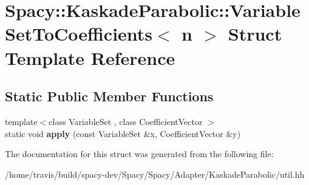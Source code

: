 \hypertarget{structSpacy_1_1KaskadeParabolic_1_1VariableSetToCoefficients}{\section{Spacy\-:\-:Kaskade\-Parabolic\-:\-:Variable\-Set\-To\-Coefficients$<$ n $>$ Struct Template Reference}
\label{structSpacy_1_1KaskadeParabolic_1_1VariableSetToCoefficients}
}
\subsection*{Static Public Member Functions}
\begin{DoxyCompactItemize}
\item 
\hypertarget{structSpacy_1_1KaskadeParabolic_1_1VariableSetToCoefficients_a282e5eeadb8a51275c7c191152d41dce}{{\footnotesize template$<$class Variable\-Set , class Coefficient\-Vector $>$ }\\static void {\bfseries apply} (const Variable\-Set \&x, Coefficient\-Vector \&y)}\label{structSpacy_1_1KaskadeParabolic_1_1VariableSetToCoefficients_a282e5eeadb8a51275c7c191152d41dce}

\end{DoxyCompactItemize}


The documentation for this struct was generated from the following file\-:\begin{DoxyCompactItemize}
\item 
/home/travis/build/spacy-\/dev/\-Spacy/\-Spacy/\-Adapter/\-Kaskade\-Parabolic/util.\-hh\end{DoxyCompactItemize}
